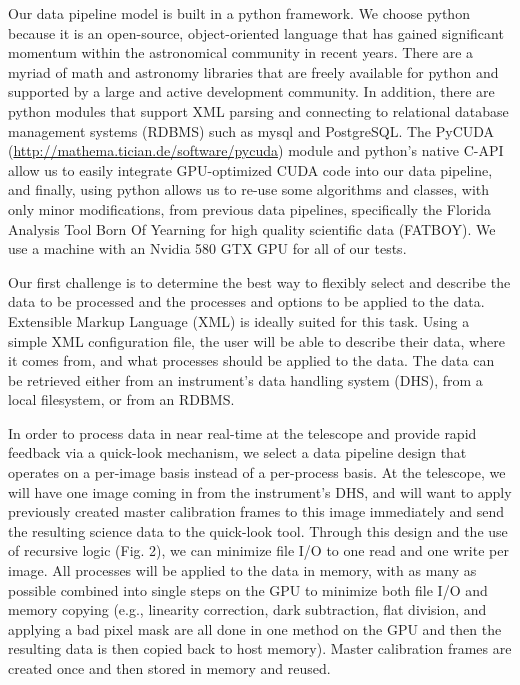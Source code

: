 Our data pipeline model is built in a python framework.  We choose python because it is an open-source, object-oriented language that has gained significant momentum within the astronomical community in recent years. There are a myriad of math and astronomy libraries that are freely available for python and supported by a large and active development community.  In addition, there are python modules that support XML parsing and connecting to relational database management systems (RDBMS) such as mysql and PostgreSQL.  The PyCUDA (\url{http://mathema.tician.de/software/pycuda}) module and python's native C-API allow us to easily integrate GPU-optimized CUDA code into our data pipeline, and finally, using python allows us to re-use some algorithms and classes, with only minor modifications, from previous data pipelines, specifically the Florida Analysis Tool Born Of Yearning for high quality scientific data (FATBOY).  We use a machine with an Nvidia 580 GTX GPU for all of our tests.

Our first challenge is to determine the best way to flexibly select and describe the data to be processed and the processes and options to be applied to the data.  Extensible Markup Language (XML) is ideally suited for this task.  Using a simple XML configuration file, the user will be able to describe their data, where it comes from, and what processes should be applied to the data.  The data can be retrieved either from an instrument's data handling system (DHS), from a local filesystem, or from an RDBMS.
 
In order to process data in near real-time at the telescope and provide rapid feedback via a quick-look mechanism, we select a data pipeline design that operates on a per-image basis instead of a per-process basis.  At the telescope, we will have one image coming in from the instrument's DHS, and will want to apply previously created master calibration frames to this image immediately and send the resulting science data to the quick-look tool. Through this design and the use of recursive logic (Fig. 2), we can minimize file I/O to one read and one write per image.  All processes will be applied to the data in memory, with as many as possible combined into single steps on the GPU to minimize both file I/O and memory copying (e.g., linearity correction, dark subtraction, flat division, and applying a bad pixel mask are all done in one method on the GPU and then the resulting data is then copied back to host memory).  Master calibration frames are created once and then stored in memory and reused.


